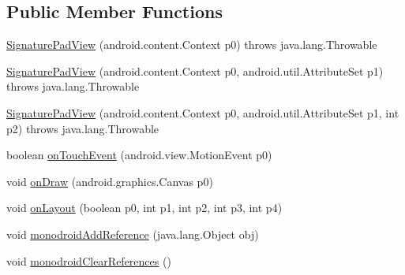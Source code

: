 \subsection*{Public Member Functions}
\begin{DoxyCompactItemize}
\item 
\hyperlink{classsignaturepad_1_1_signature_pad_view_aa7cf57f9db83213ff90f731f2903ecf1}{Signature\+Pad\+View} (android.\+content.\+Context p0)  throws java.\+lang.\+Throwable 	
\item 
\hyperlink{classsignaturepad_1_1_signature_pad_view_a85e818056cb3914af8c18a261227ccea}{Signature\+Pad\+View} (android.\+content.\+Context p0, android.\+util.\+Attribute\+Set p1)  throws java.\+lang.\+Throwable 	
\item 
\hyperlink{classsignaturepad_1_1_signature_pad_view_a9242c980b34ea13a40d54c5a1650dea1}{Signature\+Pad\+View} (android.\+content.\+Context p0, android.\+util.\+Attribute\+Set p1, int p2)  throws java.\+lang.\+Throwable 	
\item 
boolean \hyperlink{classsignaturepad_1_1_signature_pad_view_ac1a86853cbef0491ef7298bc093b980b}{on\+Touch\+Event} (android.\+view.\+Motion\+Event p0)
\item 
void \hyperlink{classsignaturepad_1_1_signature_pad_view_ab4e8041fe6f1eb6f7f4b36c87d345717}{on\+Draw} (android.\+graphics.\+Canvas p0)
\item 
void \hyperlink{classsignaturepad_1_1_signature_pad_view_aeafc1111f7082407b7039673a2138ac9}{on\+Layout} (boolean p0, int p1, int p2, int p3, int p4)
\item 
void \hyperlink{classsignaturepad_1_1_signature_pad_view_a281f4fe8560e0715b8bbae2e119a13dc}{monodroid\+Add\+Reference} (java.\+lang.\+Object obj)
\item 
void \hyperlink{classsignaturepad_1_1_signature_pad_view_a6252c82205ae2a1d3eb27bd4b3b6699d}{monodroid\+Clear\+References} ()
\end{DoxyCompactItemize}


